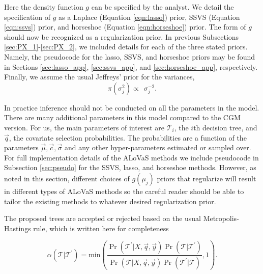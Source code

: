 Here the density function $g$ can be specified by the analyst. We detail the specification of $g$ as a Laplace (Equation \ref{eqn:lasso}) prior, SSVS (Equation \ref{eqn:ssvs}) prior, and horseshoe (Equation \ref{eqn:horseshoe}) prior. The form of $g$ should now be recognized as a regularization prior. In previous Subsections \ref{sec:PX_1}-\ref{sec:PX_2}, we included details for each of the three stated priors. Namely, the pseudocode for the lasso, SSVS, and horseshoe priors may be found in Sections \ref{sec:lasso_app}, \ref{sec:ssvs_app}, and \ref{sec:horseshoe_app}, respectively.
Finally, we assume the usual Jeffreys' prior for the variances, 
\begin{equation}
\pi(\sigma^2_j) \propto \ \  \sigma^{-2}_j. 
\end{equation}

In practice inference should not be conducted on all the parameters in the model. There are many additional parameters in this model compared to the CGM version. For us, the main parameters of interest are $\mathcal{T}_i$, the $i$th decision tree, and $\vec{q}$, the covariate selection probabilities. The probabilities are a function of the parameters $\vec{\mu},\vec{c},\vec{\sigma}$ and any other hyper-parameters estimated or sampled over. For full implementation details of the ALoVaS methods we include pseudocode in Subsection \ref{sec:pseudo} for the SSVS, lasso, and horseshoe methods. However, as noted in this section, different choices of $g(\mu_j)$ priors that regularize will result in different types of ALoVaS methods so the careful reader should be able to tailor the existing methods to whatever desired regularization prior. 

 The proposed trees are accepted or rejected based on the usual Metropolis-Hastings rule, which is written here for completeness
 
 \begin{equation}
\alpha(\mathcal{T}\vert \mathcal{T}^\prime) = \text{min}\left(\frac{\Pr(\mathcal{T}^\prime \vert X, \vec{q}, \vec{y} )\Pr(\mathcal{T}| \mathcal{T}^\prime) }{ \Pr(\mathcal{T} \vert X, \vec{q}, \vec{y})\Pr(\mathcal{T}^\prime \vert \mathcal{T}) } ,1\right).
 \end{equation}
 
